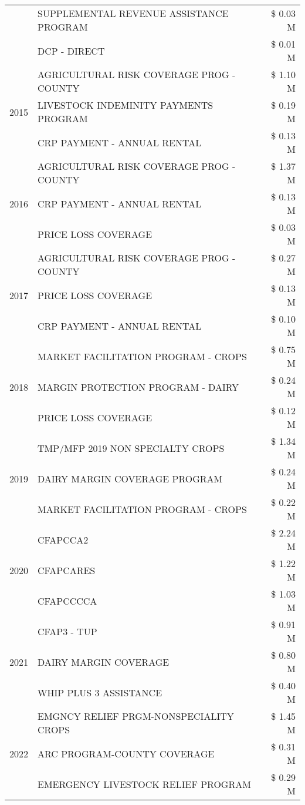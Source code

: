 \begin{tabular}{llr}
 & SUPPLEMENTAL REVENUE ASSISTANCE PROGRAM & \$ 0.03 M \\
 & DCP - DIRECT & \$ 0.01 M \\
\cline{1-3}
\multirow[t]{3}{*}{2015} & AGRICULTURAL RISK COVERAGE PROG - COUNTY & \$ 1.10 M \\
 & LIVESTOCK INDEMINITY PAYMENTS PROGRAM & \$ 0.19 M \\
 & CRP PAYMENT - ANNUAL RENTAL & \$ 0.13 M \\
\cline{1-3}
\multirow[t]{3}{*}{2016} & AGRICULTURAL RISK COVERAGE PROG - COUNTY & \$ 1.37 M \\
 & CRP PAYMENT - ANNUAL RENTAL & \$ 0.13 M \\
 & PRICE LOSS COVERAGE & \$ 0.03 M \\
\cline{1-3}
\multirow[t]{3}{*}{2017} & AGRICULTURAL RISK COVERAGE PROG - COUNTY & \$ 0.27 M \\
 & PRICE LOSS COVERAGE & \$ 0.13 M \\
 & CRP PAYMENT - ANNUAL RENTAL & \$ 0.10 M \\
\cline{1-3}
\multirow[t]{3}{*}{2018} & MARKET FACILITATION PROGRAM - CROPS & \$ 0.75 M \\
 & MARGIN PROTECTION PROGRAM - DAIRY & \$ 0.24 M \\
 & PRICE LOSS COVERAGE & \$ 0.12 M \\
\cline{1-3}
\multirow[t]{3}{*}{2019} & TMP/MFP 2019 NON SPECIALTY CROPS & \$ 1.34 M \\
 & DAIRY MARGIN COVERAGE PROGRAM & \$ 0.24 M \\
 & MARKET FACILITATION PROGRAM - CROPS & \$ 0.22 M \\
\cline{1-3}
\multirow[t]{3}{*}{2020} & CFAPCCA2 & \$ 2.24 M \\
 & CFAPCARES & \$ 1.22 M \\
 & CFAPCCCCA & \$ 1.03 M \\
\cline{1-3}
\multirow[t]{3}{*}{2021} & CFAP3 - TUP & \$ 0.91 M \\
 & DAIRY MARGIN COVERAGE & \$ 0.80 M \\
 & WHIP PLUS 3 ASSISTANCE & \$ 0.40 M \\
\cline{1-3}
\multirow[t]{3}{*}{2022} & EMGNCY RELIEF PRGM-NONSPECIALITY CROPS & \$ 1.45 M \\
 & ARC PROGRAM-COUNTY COVERAGE & \$ 0.31 M \\
 & EMERGENCY LIVESTOCK RELIEF PROGRAM & \$ 0.29 M \\
\cline{1-3}
\bottomrule
\end{tabular}
